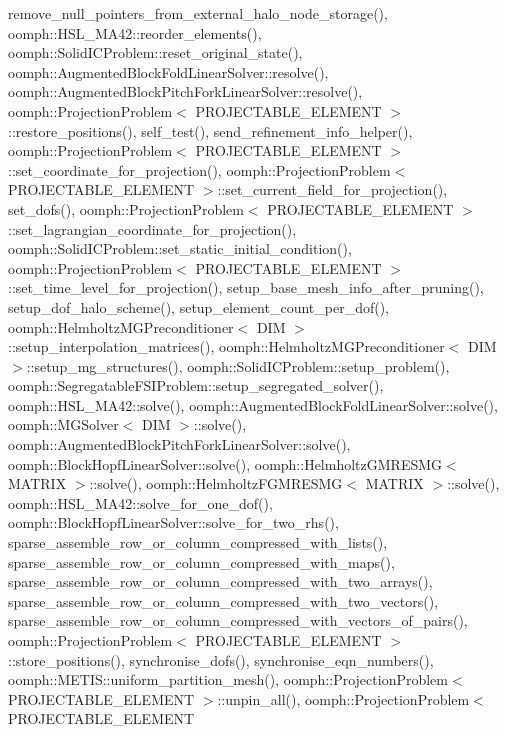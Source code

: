 remove\+\_\+null\+\_\+pointers\+\_\+from\+\_\+external\+\_\+halo\+\_\+node\+\_\+storage(), oomph\+::\+H\+S\+L\+\_\+\+M\+A42\+::reorder\+\_\+elements(), oomph\+::\+Solid\+I\+C\+Problem\+::reset\+\_\+original\+\_\+state(), oomph\+::\+Augmented\+Block\+Fold\+Linear\+Solver\+::resolve(), oomph\+::\+Augmented\+Block\+Pitch\+Fork\+Linear\+Solver\+::resolve(), oomph\+::\+Projection\+Problem$<$ P\+R\+O\+J\+E\+C\+T\+A\+B\+L\+E\+\_\+\+E\+L\+E\+M\+E\+N\+T $>$\+::restore\+\_\+positions(), self\+\_\+test(), send\+\_\+refinement\+\_\+info\+\_\+helper(), oomph\+::\+Projection\+Problem$<$ P\+R\+O\+J\+E\+C\+T\+A\+B\+L\+E\+\_\+\+E\+L\+E\+M\+E\+N\+T $>$\+::set\+\_\+coordinate\+\_\+for\+\_\+projection(), oomph\+::\+Projection\+Problem$<$ P\+R\+O\+J\+E\+C\+T\+A\+B\+L\+E\+\_\+\+E\+L\+E\+M\+E\+N\+T $>$\+::set\+\_\+current\+\_\+field\+\_\+for\+\_\+projection(), set\+\_\+dofs(), oomph\+::\+Projection\+Problem$<$ P\+R\+O\+J\+E\+C\+T\+A\+B\+L\+E\+\_\+\+E\+L\+E\+M\+E\+N\+T $>$\+::set\+\_\+lagrangian\+\_\+coordinate\+\_\+for\+\_\+projection(), oomph\+::\+Solid\+I\+C\+Problem\+::set\+\_\+static\+\_\+initial\+\_\+condition(), oomph\+::\+Projection\+Problem$<$ P\+R\+O\+J\+E\+C\+T\+A\+B\+L\+E\+\_\+\+E\+L\+E\+M\+E\+N\+T $>$\+::set\+\_\+time\+\_\+level\+\_\+for\+\_\+projection(), setup\+\_\+base\+\_\+mesh\+\_\+info\+\_\+after\+\_\+pruning(), setup\+\_\+dof\+\_\+halo\+\_\+scheme(), setup\+\_\+element\+\_\+count\+\_\+per\+\_\+dof(), oomph\+::\+Helmholtz\+M\+G\+Preconditioner$<$ D\+I\+M $>$\+::setup\+\_\+interpolation\+\_\+matrices(), oomph\+::\+Helmholtz\+M\+G\+Preconditioner$<$ D\+I\+M $>$\+::setup\+\_\+mg\+\_\+structures(), oomph\+::\+Solid\+I\+C\+Problem\+::setup\+\_\+problem(), oomph\+::\+Segregatable\+F\+S\+I\+Problem\+::setup\+\_\+segregated\+\_\+solver(), oomph\+::\+H\+S\+L\+\_\+\+M\+A42\+::solve(), oomph\+::\+Augmented\+Block\+Fold\+Linear\+Solver\+::solve(), oomph\+::\+M\+G\+Solver$<$ D\+I\+M $>$\+::solve(), oomph\+::\+Augmented\+Block\+Pitch\+Fork\+Linear\+Solver\+::solve(), oomph\+::\+Block\+Hopf\+Linear\+Solver\+::solve(), oomph\+::\+Helmholtz\+G\+M\+R\+E\+S\+M\+G$<$ M\+A\+T\+R\+I\+X $>$\+::solve(), oomph\+::\+Helmholtz\+F\+G\+M\+R\+E\+S\+M\+G$<$ M\+A\+T\+R\+I\+X $>$\+::solve(), oomph\+::\+H\+S\+L\+\_\+\+M\+A42\+::solve\+\_\+for\+\_\+one\+\_\+dof(), oomph\+::\+Block\+Hopf\+Linear\+Solver\+::solve\+\_\+for\+\_\+two\+\_\+rhs(), sparse\+\_\+assemble\+\_\+row\+\_\+or\+\_\+column\+\_\+compressed\+\_\+with\+\_\+lists(), sparse\+\_\+assemble\+\_\+row\+\_\+or\+\_\+column\+\_\+compressed\+\_\+with\+\_\+maps(), sparse\+\_\+assemble\+\_\+row\+\_\+or\+\_\+column\+\_\+compressed\+\_\+with\+\_\+two\+\_\+arrays(), sparse\+\_\+assemble\+\_\+row\+\_\+or\+\_\+column\+\_\+compressed\+\_\+with\+\_\+two\+\_\+vectors(), sparse\+\_\+assemble\+\_\+row\+\_\+or\+\_\+column\+\_\+compressed\+\_\+with\+\_\+vectors\+\_\+of\+\_\+pairs(), oomph\+::\+Projection\+Problem$<$ P\+R\+O\+J\+E\+C\+T\+A\+B\+L\+E\+\_\+\+E\+L\+E\+M\+E\+N\+T $>$\+::store\+\_\+positions(), synchronise\+\_\+dofs(), synchronise\+\_\+eqn\+\_\+numbers(), oomph\+::\+M\+E\+T\+I\+S\+::uniform\+\_\+partition\+\_\+mesh(), oomph\+::\+Projection\+Problem$<$ P\+R\+O\+J\+E\+C\+T\+A\+B\+L\+E\+\_\+\+E\+L\+E\+M\+E\+N\+T $>$\+::unpin\+\_\+all(), oomph\+::\+Projection\+Problem$<$ P\+R\+O\+J\+E\+C\+T\+A\+B\+L\+E\+\_\+\+E\+L\+E\+M\+E\+N\+T 